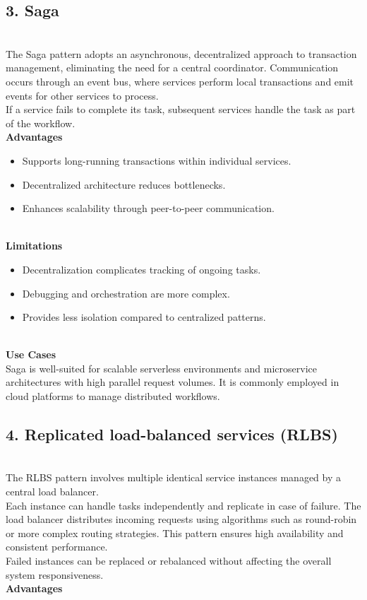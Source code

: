 \subsection{3. Saga}\label{BvPanIqfyXeEy8ewl4x14}
\\
The Saga pattern adopts an asynchronous, decentralized approach to transaction management, eliminating the need for a central coordinator. Communication occurs through an event bus, where services perform local transactions and emit events for other services to process.
\\
If a service fails to complete its task, subsequent services handle the task as part of the workflow.
\\
\textbf{Advantages}

\begin{itemize}
\item
\protect{}\label{-t-Kp8PMRj0I9hS6efLaY}
Supports long-running transactions within individual services.
\item
\protect{}\label{_XrZAjJuNWE1_fhipHQD8}
Decentralized architecture reduces bottlenecks.
\item
\protect{}\label{82Yo394GrJU5gRhftHJ6x}
Enhances scalability through peer-to-peer communication.
\end{itemize}
\\
\textbf{Limitations}

\begin{itemize}
\item
\protect{}\label{f-qZOIIa6j9whuazOuPjK}
Decentralization complicates tracking of ongoing tasks.
\item
\protect{}\label{GVY0pDc2AM_E1kMqbJkFF}
Debugging and orchestration are more complex.
\item
\protect{}\label{TpB5SjkegkrHIvRma6jYM}
Provides less isolation compared to centralized patterns.
\end{itemize}
\\
\textbf{Use Cases}
\\
Saga is well-suited for scalable serverless environments and microservice architectures with high parallel request volumes. It is commonly employed in cloud platforms to manage distributed workflows.

\subsection{4. Replicated load-balanced services (RLBS)}\label{wYbBRks4s8G52i2ZLvfyo}
\\
The RLBS pattern involves multiple identical service instances managed by a central load balancer.
\\
Each instance can handle tasks independently and replicate in case of failure. The load balancer distributes incoming requests using algorithms such as round-robin or more complex routing strategies. This pattern ensures high availability and consistent performance.
\\
Failed instances can be replaced or rebalanced without affecting the overall system responsiveness.
\\
\textbf{Advantages}

